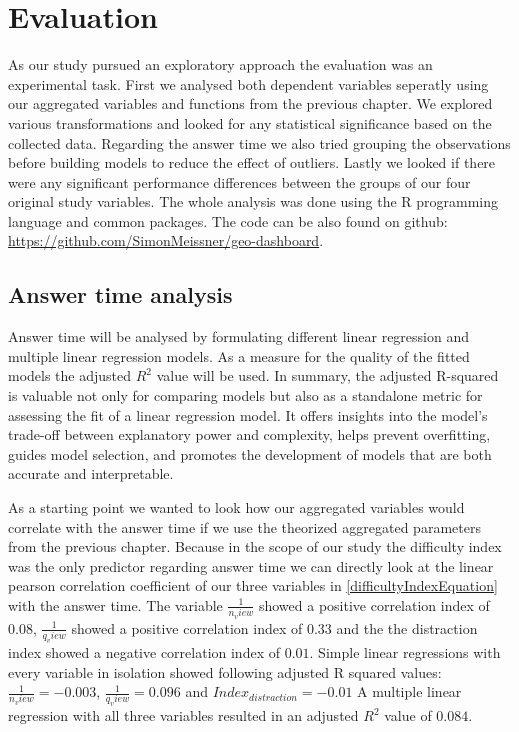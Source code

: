 \chapter{Evaluation}
As our study pursued an exploratory approach the evaluation was an experimental task. First we analysed both dependent variables seperatly
using our aggregated variables and functions from the previous chapter. We explored various transformations and looked for any statistical
significance based on the collected data. Regarding the answer time we also tried grouping the observations before building models to reduce the 
effect of outliers. Lastly we looked if there were any significant performance differences between
the groups of our four original study variables. The whole analysis was done using the R programming language and common packages. The code can be also
found on github: \url{https://github.com/SimonMeissner/geo-dashboard}.

\section{Answer time analysis}
Answer time will be analysed by formulating different linear regression and multiple linear regression models. As a measure for the quality of
the fitted models the adjusted $R^2$ value will be used. In summary, the adjusted R-squared is valuable not only for comparing models but also as a
standalone metric for assessing the fit of a linear regression model. It offers insights into the model's trade-off between explanatory power and
complexity, helps prevent overfitting, guides model selection, and promotes the development of models that are both accurate and interpretable.

As a starting point we wanted to look how our aggregated variables would correlate with the answer time if we use the theorized aggregated parameters
from the previous chapter. Because in the scope of our study the difficulty index was the only predictor regarding answer time we can directly look at the
linear pearson correlation coefficient of our three variables in \ref{difficultyIndexEquation} with the answer time.
The variable $\frac{1}{n_view}$ showed a positive correlation index of $0.08$, $\frac{1}{q_view}$ showed a positive correlation index of $0.33$
and the the distraction index showed a negative correlation index of $0.01$. Simple linear regressions with every variable in isolation showed following
adjusted R squared values: $\frac{1}{n_view} = -0.003$, $\frac{1}{q_view} = 0.096$ and $Index_{distraction} = -0.01$
A multiple linear regression with all three variables resulted in an adjusted $R^2$ value of $0.084$.


